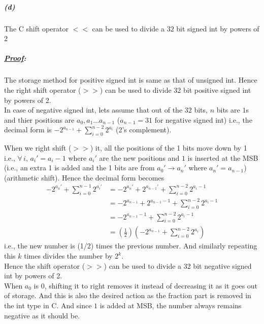 \documentclass[12pt, letterpaper]{article}
\begin{document}
\subparagraph{(d)} The C shift operator $<<$ can be used to divide a $32$ bit signed int by powers of 2
\subparagraph{\textit{\underline{Proof}:}}

The storage method for positive signed int is same as that of unsigned int. Hence the right shift operator ($>>$) can be used to divide 32 bit positive signed int by powers of 2.\\

In case of negative signed int, lets assume that out of the $32$ bits, $n$ bits are $1$s and thier positions are $a_0,a_1 ...a_{n-1}$ ($a_{n-1} = 31$ for negative signed int) i.e., the decimal form is $-2^{a_{n-1}} + \sum_{i=0}^{n-2}2^{a_i}$ (2's complement).

When we right shift ($>>$) it, all the positions of the 1 bits move down by 1 i.e., $\forall\, i,\,a_i' = a_i - 1$  where $a_i'$ are the new positions and $1$ is inserted at the MSB (i.e., an extra 1 is added and the 1 bits are from $a_0' \to a_n'$ where $a_n' = a_{n-1}$) (arithmetic shift).
Hence the decimal form becomes
\[\begin{split}
-2^{a_n'} + \sum_{i=0}^{n-1}2^{a_i'}
&= -2^{a_n'} + 2^{a_{n-1}'} + \sum_{i=0}^{n-2}2^{a_i - 1}\\
&= -2^{a_{n-1}} + 2^{a_{n-1} - 1} + \sum_{i=0}^{n-2}2^{a_i - 1}\\
&= -2^{a_{n-1} - 1} + \sum_{i=0}^{n-2}2^{a_i - 1}\\
&= \boxed{\left(\frac{1}{2}\right)\left(-2^{a_{n-1}} + \sum_{i=0}^{n-2}2^{a_i}\right)}
\end{split}\]
i.e., the new number is (1/2) times the previous number.
And similarly repeating this $k$ times divides the number by $2^k$.\\

Hence the shift operator ($>>$) can be used to divide a 32 bit negative signed int by powers of 2.\\

When $a_{0}$ is $0$, shifting it to right removes it instead of decreasing it as it goes out of storage. And this is also the desired action as the fraction part is removed in the int type in C. And since $1$ is added at MSB, the number always remains negative as it should be.
\end{document}
